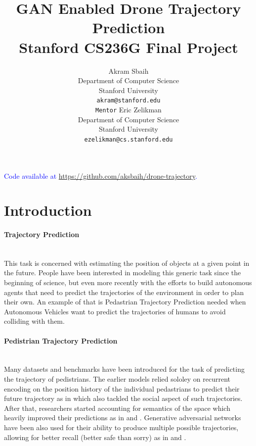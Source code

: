 \documentclass{article}
\title{
  GAN Enabled Drone Trajectory Prediction \\
  \vspace{1em}
  \small{\normalfont Stanford CS236G Final Project} 
}
\author{
  Akram Sbaih \\
  Department of Computer Science \\
  Stanford University \\
  \texttt{akram@stanford.edu} \\
     \And
   \texttt{Mentor} Eric Zelikman \\
   Department of Computer Science \\
   Stanford University \\
   \texttt{ezelikman@cs.stanford.edu} \\
}
\newcommand{\note}[1]{\textcolor{blue}{{#1}}}
\begin{document}
\maketitle




\note{Code available at \href{https://github.com/aksbaih/drone-trajectory}{https://github.com/aksbaih/drone-trajectory}.}

\section{Introduction}
\paragraph{Trajectory Prediction}$ $
\\This task is concerned with estimating the position of objects at a given point in the future. People have been interested in modeling this generic task since the beginning of science, but even more recently with the efforts to build autonomous agents that need to predict the trajectories of the environment in order to plan their own. An example of that is Pedastrian Trajectory Prediction needed when Autonomous Vehicles want to predict the trajectories of humans to avoid colliding with them. 

\paragraph{Pedistrian Trajectory Prediction}$ $
\\Many datasets and benchmarks \cite{stanforddrone}\cite{trajneteval} have been introduced for the task of predicting the trajectory of pedistrians.  The earlier models relied sololey on recurrent encoding on the position history of the individual pedastrians to predict their future trajectory as in \cite{sociallstm} which also tackled the social aspect of such trajectories.  After that, researchers started accounting for semantics of the space which heavily improved their predictions as in \cite{ynet} and \cite{sophie}. Generative adversarial networks have been also used for their ability to produce multiple possible trajectories, allowing for better recall (better safe than sorry) as in \cite{sophie} and \cite{socialgan}. 
\end{document}
